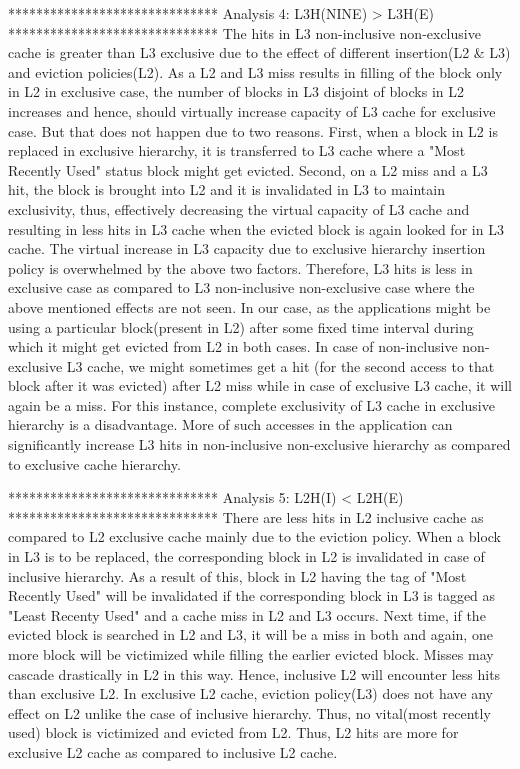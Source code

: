 \documentclass[12pt]{article}
\begin{document}
******************************
Analysis 4: L3H(NINE) > L3H(E)
******************************
The hits in L3 non-inclusive non-exclusive cache is greater than L3 exclusive due to the effect of different insertion(L2 & L3) and eviction policies(L2). As a L2 and L3 miss results in filling of the block only in L2 in exclusive case, the number of blocks in L3 disjoint of blocks in L2 increases and hence, should virtually increase capacity of L3 cache for exclusive case. But that does not happen due to two reasons. First, when a block in L2 is replaced in exclusive hierarchy, it is transferred to L3 cache where a "Most Recently Used" status block might get evicted. Second, on a L2 miss and a L3 hit, the block is brought into L2 and it is invalidated in L3 to maintain exclusivity, thus, effectively decreasing the virtual capacity of L3 cache and resulting in less hits in L3 cache when the evicted block is again looked for in L3 cache. The virtual increase in L3 capacity due to exclusive hierarchy insertion policy is overwhelmed by the above two factors. Therefore, L3 hits is less in exclusive case as compared to L3 non-inclusive non-exclusive case where the above mentioned effects are not seen. In our case, as the applications might be using a particular block(present in L2) after some fixed time interval during which it might get evicted from L2 in both cases. In case of non-inclusive non-exclusive L3 cache, we might sometimes get a hit (for the second access to that block after it was evicted) after L2 miss while in case of exclusive L3 cache, it will again be a miss. For this instance, complete exclusivity of L3 cache in exclusive hierarchy is a disadvantage. More of such accesses in the application can significantly increase L3 hits in non-inclusive non-exclusive hierarchy as compared to exclusive cache hierarchy.

******************************
Analysis 5: L2H(I) < L2H(E)
******************************
There are less hits in L2 inclusive cache as compared to L2 exclusive cache mainly due to the eviction policy. When a block in L3 is to be replaced, the corresponding block in L2 is invalidated in case of inclusive hierarchy. As a result of this, block in L2 having the tag of "Most Recently Used" will be invalidated if the corresponding block in L3 is tagged as "Least Recenty Used" and a cache miss in L2 and L3 occurs. Next time, if the evicted block is searched in L2 and L3, it will be a miss in both and again, one more block will be victimized while filling the earlier evicted block. Misses may cascade drastically in L2 in this way. Hence, inclusive L2 will encounter less hits than exclusive L2. In exclusive L2 cache, eviction policy(L3) does not have any effect on L2 unlike the case of inclusive hierarchy. Thus, no vital(most recently used) block is victimized and evicted from L2. Thus, L2 hits are more for exclusive L2 cache as compared to inclusive L2 cache.
\end{document}
